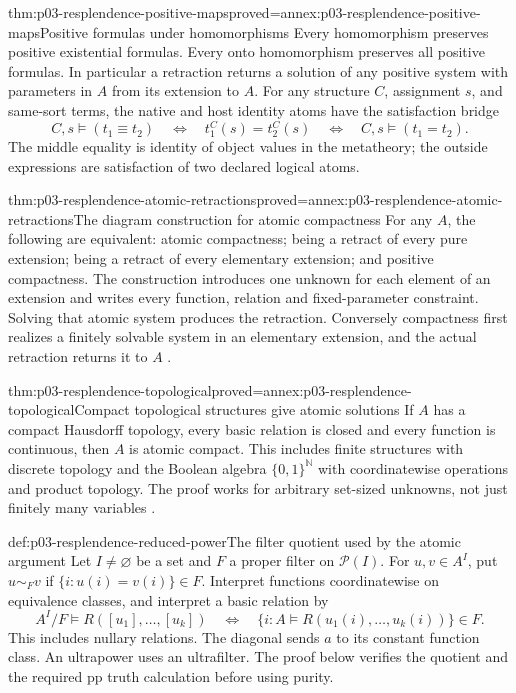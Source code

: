 \begin{hblemma}{thm:p03-resplendence-positive-maps}{proved=annex:p03-resplendence-positive-maps}{Positive formulas under homomorphisms}
Every homomorphism preserves positive existential formulas. Every onto
homomorphism preserves all positive formulas. In particular a retraction
returns a solution of any positive system with parameters in \(A\)
from its extension to \(A\).
For any structure \(C\), assignment \(s\), and same-sort terms,
the native and host identity atoms have the satisfaction bridge
\[
 C,s\models(t_1\equiv t_2)
 \quad\Longleftrightarrow\quad t_1^C(s)=t_2^C(s)
 \quad\Longleftrightarrow\quad C,s\models(t_1=t_2).
\]
The middle equality is identity of object values in the metatheory;
the outside expressions are satisfaction of two declared logical atoms.
\end{hblemma}

\begin{hbtheorem}{thm:p03-resplendence-atomic-retractions}{proved=annex:p03-resplendence-atomic-retractions}{The diagram construction for atomic compactness}
For any \(A\), the following are equivalent: atomic compactness;
being a retract of every pure extension; being a retract of every
elementary extension; and positive compactness. The construction introduces
one unknown for each element of an extension and writes every function,
relation and fixed-parameter constraint. Solving that atomic system
produces the retraction. Conversely compactness first realizes a finitely
solvable system in an elementary extension, and the actual retraction
returns it to \(A\) \cite[\S2, p.~101]{Delhomme1999AtomicGraphs}.
\end{hbtheorem}

\begin{hbtheorem}{thm:p03-resplendence-topological}{proved=annex:p03-resplendence-topological}{Compact topological structures give atomic solutions}
If \(A\) has a compact Hausdorff topology, every basic relation is closed
and every function is continuous, then \(A\) is atomic compact.
This includes finite structures with discrete topology and the Boolean
algebra \(\{0,1\}^{\mathbb N}\) with coordinatewise operations and
product topology. The proof works for arbitrary set-sized unknowns, not
just finitely many variables \cite[\S2, pp.~101--102]{Delhomme1999AtomicGraphs}.
\end{hbtheorem}

\begin{hbdefinition}{def:p03-resplendence-reduced-power}{The filter quotient used by the atomic argument}
Let \(I\ne\varnothing\) be a set and \(F\) a proper filter on
\(\mathcal P(I)\). For \(u,v\in A^I\), put
\(u\sim_F v\) if \(\{i:u(i)=v(i)\}\in F\). Interpret functions
coordinatewise on equivalence classes, and interpret a basic relation by
\[
 A^I/F\models R([u_1],\ldots,[u_k])
 \quad\Longleftrightarrow\quad
 \{i:A\models R(u_1(i),\ldots,u_k(i))\}\in F.
\]
This includes nullary relations. The diagonal sends \(a\) to its constant
function class. An ultrapower uses an ultrafilter. The proof below verifies
the quotient and the required pp truth calculation before using purity.
\end{hbdefinition}

